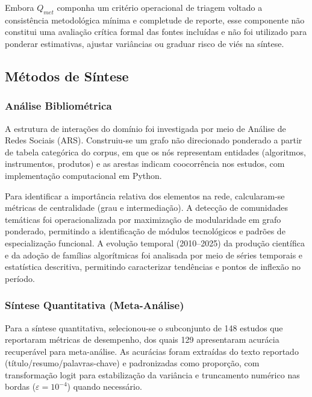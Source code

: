 Embora $Q_{met}$ componha um critério operacional de triagem voltado a consistência metodológica mínima e completude de reporte, esse componente não constitui uma avaliação crítica formal das fontes incluídas e não foi utilizado para ponderar estimativas, ajustar variâncias ou graduar risco de viés na síntese.

\subsection[Métodos de Síntese]{Métodos de Síntese}

\subsubsection[Análise Bibliométrica]{Análise Bibliométrica}

A estrutura de interações do domínio foi investigada por meio de Análise de Redes Sociais (ARS). Construiu-se um grafo não direcionado ponderado a partir de tabela categórica do corpus, em que os nós representam entidades (algoritmos, instrumentos, produtos) e as arestas indicam coocorrência nos estudos, com implementação computacional em Python.

Para identificar a importância relativa dos elementos na rede, calcularam-se métricas de centralidade (grau e intermediação). A detecção de comunidades temáticas foi operacionalizada por maximização de modularidade em grafo ponderado, permitindo a identificação de módulos tecnológicos e padrões de especialização funcional. A evolução temporal (2010--2025) da produção científica e da adoção de famílias algorítmicas foi analisada por meio de séries temporais e estatística descritiva, permitindo caracterizar tendências e pontos de inflexão no período.

\subsubsection[Síntese Quantitativa]{Síntese Quantitativa (Meta-Análise)}

Para a síntese quantitativa, selecionou-se o subconjunto de 148 estudos que reportaram métricas de desempenho, dos quais 129 apresentaram acurácia recuperável para meta-análise. As acurácias foram extraídas do texto reportado (título/resumo/palavras-chave) e padronizadas como proporção, com transformação logit para estabilização da variância e truncamento numérico nas bordas ($\varepsilon=10^{-4}$) quando necessário. 

